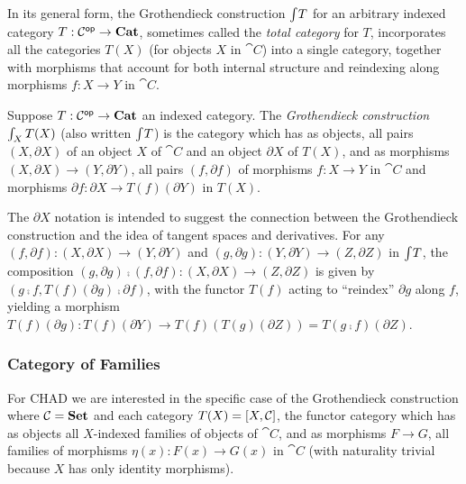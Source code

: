 In its general form, the Grothendieck construction $\int_{}T$ for an arbitrary indexed category $T:
\mathcal{C}^{\mathsf{op}} \to \mathbf{Cat}$, sometimes called the \emph{total category} for $T$, incorporates all the categories
$T(X)$ (for objects $X$ in $\cat{C}$) into a single category, together with morphisms that account for both
internal structure and reindexing along morphisms $f: X \to Y$ in $\cat{C}$.

\begin{definition}
\label{def:Grothendieck}
Suppose $T: \mathcal{C}^{\mathsf{op}} \to \mathbf{Cat}$ an indexed category. The \emph{Grothendieck construction}
$\int_{X}T(X)$ (also written $\int_{}T$) is the category which has as objects, all pairs $(X,
\partial X)$ of an object $X$ of $\cat{C}$ and an object $\partial X$ of $T(X)$, and as morphisms $(X,
\partial X) \to (Y, \partial Y)$, all pairs $(f, \partial f)$ of morphisms $f: X \to Y$ in $\cat{C}$ and
morphisms $\partial f: \partial X \to T(f)(\partial Y)$ in $T(X)$.
\end{definition}

\noindent The $\partial X$ notation is intended to suggest the connection between the Grothendieck
construction and the idea of tangent spaces and derivatives. For any $(f, \partial f): (X, \partial X) \to (Y,
\partial Y)$ and $(g, \partial g): (Y, \partial Y) \to (Z, \partial Z)$ in $\int_{}T$, the composition
$(g, \partial g) \comp (f, \partial f): (X, \partial X) \to (Z, \partial Z)$ is given by $(g \comp f,
T(f)(\partial g) \comp \partial f)$, with the functor $T(f)$ acting to ``reindex'' $\partial g$ along $f$,
yielding a morphism $T(f)(\partial g): T(f)(\partial Y) \to T(f)(T(g)(\partial Z)) = T(g \comp f)(\partial
Z)$.


\subsubsection{Category of Families}
\label{sec:Fam}

For CHAD we are interested in the specific case of the Grothendieck construction where $\mathcal{C} = \mathbf{Set}$ and
each category $T(X) = [X,\mathcal{C}]$, the functor category which has as objects all $X$-indexed families
of objects of $\cat{C}$, and as morphisms $F \to G$, all families of morphisms $\eta(x): F(x) \to G(x)$ in
$\cat{C}$ (with naturality trivial because $X$ has only identity morphisms).

